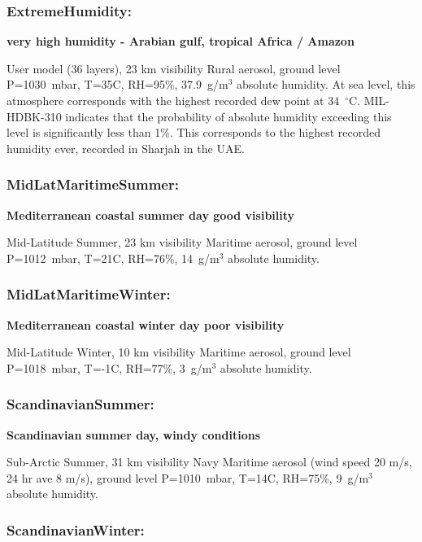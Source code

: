 \documentclass{workpackage}
\begin{document}
\subsubsection{ExtremeHumidity:}
\label{sec:ExtremeHumidity}

\textbf{very high humidity - Arabian gulf, tropical Africa / Amazon}

User model (36 layers), 23 km visibility  Rural aerosol, ground level P=1030~mbar, T=35C, RH=95\%, 37.9~g/m$^3$ absolute humidity. 
At sea level, this atmosphere corresponds with  the highest recorded dew point at 34~$^\circ$C.  MIL-HDBK-310 indicates that the probability of absolute humidity exceeding this level is significantly less than 1\%. This corresponds to the highest recorded humidity ever, recorded in Sharjah in the UAE.

\subsubsection{MidLatMaritimeSummer:}
\label{sec:MidLatMaritimeSummer}

\textbf{Mediterranean coastal summer day good visibility}

Mid-Latitude Summer, 23 km visibility  Maritime aerosol, ground level P=1012~mbar, T=21C, RH=76\%, 14~g/m$^3$ absolute humidity.

\subsubsection{MidLatMaritimeWinter:}
\label{sec:MidLatMaritimeWinter}

\textbf{Mediterranean coastal winter day poor visibility}

Mid-Latitude Winter, 10 km visibility  Maritime aerosol, ground level P=1018~mbar, T=-1C, RH=77\%, 3~g/m$^3$ absolute humidity.

\subsubsection{ScandinavianSummer:}
\label{sec:ScandinavianSummer}

\textbf{Scandinavian summer day, windy conditions}

Sub-Arctic Summer, 31 km visibility  Navy Maritime aerosol (wind speed 20 m/s, 24 hr ave 8 m/s), ground level P=1010~mbar, T=14C, RH=75\%, 9~g/m$^3$ absolute humidity.

\subsubsection{ScandinavianWinter:}
\label{sec:ScandinavianWinter}
\end{document}

